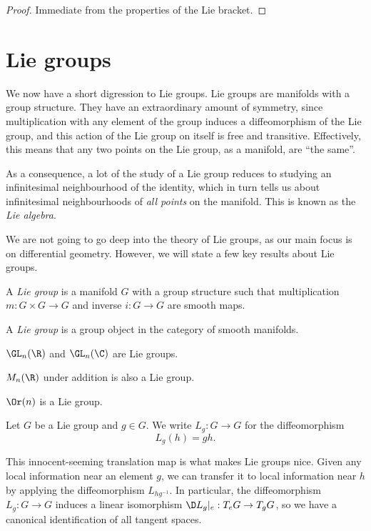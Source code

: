 \documentclass[a4paper]{article}
\begin{document}
\begin{proof}
  Immediate from the properties of the Lie bracket.
\end{proof}

\section{Lie groups}
We now have a short digression to Lie groups. Lie groups are manifolds with a group structure. They have an extraordinary amount of symmetry, since multiplication with any element of the group induces a diffeomorphism of the Lie group, and this action of the Lie group on itself is free and transitive. Effectively, this means that any two points on the Lie group, as a manifold, are ``the same''.

As a consequence, a lot of the study of a Lie group reduces to studying an infinitesimal neighbourhood of the identity, which in turn tells us about infinitesimal neighbourhoods of \emph{all points} on the manifold. This is known as the \emph{Lie algebra}.

We are not going to go deep into the theory of Lie groups, as our main focus is on differential geometry. However, we will state a few key results about Lie groups.

\begin{defi}
  A \emph{Lie group} is a manifold $G$ with a group structure such that multiplication $m: G \times G \to G$ and inverse $i: G \to G$ are smooth maps.
\end{defi}

\begin{own}
  \begin{defi}
    A \emph{Lie group} is a group object in the category of smooth manifolds.
  \end{defi}
\end{own}

\begin{eg}
  $\GL_n(\R)$ and $\GL_n(\C)$ are Lie groups.
\end{eg}

\begin{eg}
  $M_n(\R)$ under addition is also a Lie group.
\end{eg}

\begin{eg}
  $\Or(n)$ is a Lie group.
\end{eg}

\begin{notation}
  Let $G$ be a Lie group and $g \in G$. We write $L_g: G \to G$ for the diffeomorphism
  \[
    L_g(h) = gh.
  \]
\end{notation}
This innocent-seeming translation map is what makes Lie groups nice. Given any local information near an element $g$, we can transfer it to local information near $h$ by applying the diffeomorphism $L_{hg^{-1}}$. In particular, the diffeomorphism $L_g: G \to G$ induces a linear isomorphism $\D L_g|_e : T_e G \to T_g G$, so we have a canonical identification of all tangent spaces.
\end{document}

